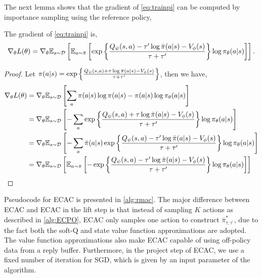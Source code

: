 The next lemma shows that the gradient of \cref{eq:trainpi} can be computed by importance sampling using the reference policy, 
\begin{lem}
\label{lem:rmacgradientestimate}
The gradient of \cref{eq:trainpi} is,
\begin{equation}
\label{eq:mac_gradient_estimator}
	\nabla_\theta L(\theta) = \nabla_\theta {\mathbb{E}}_{s \sim {\mathcal{D}}} \left[ {\mathbb{E}}_{a\sim \bar{\pi}}\left[  \exp\left\{ \frac{Q_{\psi}(s,a) - \tau' \log \bar{\pi}(a|s) - V_{\phi}(s)}{\tau+\tau'} \right\} \log \pi_{\theta}(a |s) \right]   \right].
\end{equation}
\end{lem}
\begin{proof}
Let $\pi(a \vert s) =  \exp\left\{ \frac{Q_{\psi}(s,a) + \tau \log \bar{\pi}(a|s) - V_{\phi}(s)}{\tau+\tau'} \right\}$, then we have,
\begin{align*}
	\nabla_\theta L(\theta) &= \nabla_\theta  {\mathbb{E}}_{s \sim {\mathcal{D}}} \left[\sum_a  \pi(a|s) \log \pi(a|s) - \pi(a|s) \log \pi_\theta(a|s) \right]\\
	&= \nabla_\theta {\mathbb{E}}_{s \sim {\mathcal{D}}} \left[ -\sum_a \exp\left\{ \frac{Q_{\psi}(s,a) + \tau \log \bar{\pi}(a|s) - V_{\phi}(s)}{\tau+\tau'} \right\} \log \pi_{\theta}(a |s) \right] \\ 
	&= \nabla_\theta {\mathbb{E}}_{s \sim {\mathcal{D}}} \left[ -\sum_a \bar{\pi}(a|s) \exp\left\{ \frac{Q_{\psi}(s,a) - \tau' \log \bar{\pi}(a|s) - V_{\phi}(s)}{\tau+\tau'} \right\} \log \pi_{\theta}(a |s) \right] \\ 
	&= \nabla_\theta {\mathbb{E}}_{s \sim {\mathcal{D}}} \left[ {\mathbb{E}}_{a\sim \bar{\pi}}\left[ - \exp\left\{ \frac{Q_{\psi}(s,a) - \tau' \log \bar{\pi}(a|s) - V_{\phi}(s)}{\tau+\tau'} \right\} \log \pi_{\theta}(a |s) \right]   \right] 
\end{align*}
\end{proof}
Pseudocode for ECAC is presented in \cref{alg:rmac}. The major difference between ECAC and ECAC in the lift step is that instead of sampling $K$ actions as described in \cref{alg:ECPO}, ECAC only samples one action to construct $\bar{\pi}_{\tau,\tau^{\prime}}^*$, due to the fact both the soft-Q and state value function approximations are adopted. The value function approximations also make ECAC capable of using off-policy data from a reply buffer. Furthermore, in the project step of ECAC, we use a fixed number of iteration for SGD, which is given by an input parameter of the algorithm.

